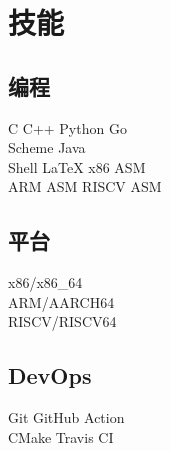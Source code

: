 \documentclass[]{deedy-resume-openfont}
\begin{document}
\begin{minipage}[t]{0.25\textwidth}

\section{技能}
\subsection{编程}
C \textbullet{} C++ \textbullet{} Python \textbullet{} Go \\
Scheme \textbullet{} Java \\
Shell \textbullet{} \LaTeX \textbullet{} x86 ASM \\
ARM ASM \textbullet{} RISCV ASM \\
\sectionsep

\subsection{平台}
x86/x86\_64 \\
ARM/AARCH64 \\
RISCV/RISCV64 \\
\sectionsep

\subsection{DevOps}
Git \textbullet{} GitHub Action \\
CMake \textbullet{} Travis CI

%
%

\end{minipage} 
\hfill
\end{document}
